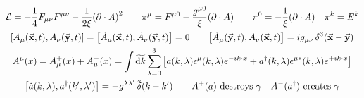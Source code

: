 \begin{gather*}
        \Lc = -\frac{1}{4}F_{\mu\nu}F^{\mu\nu} - \frac{1}{2\xi}\qty(\partial\cdot A)^2
        \qquad
        \pi^\mu = F^{\mu0} - \frac{g^{\mu0}}{\xi}\qty(\partial\cdot A)
        \qquad
        \pi^0 = -\frac{1}{\xi}\qty(\partial\cdot A)
        \quad
        \pi^k = E^k
        \\
        \comm{A_\mu(\va{x},t)}{A_\nu(\va{y},t)}
        = \comm{\dot{A}_\mu(\va{x},t)}{\dot{A}_\nu(\va{y},t)}
        = 0
        \qquad
        \comm{\dot{A}_\mu(\va{y},t)}{A_\nu(\va{x},t)}
        = ig_{\mu\nu}\Ddelta[3](\va{x}-\va{y})
        \\
        A^\mu(x)
        = A_\mu^+(x) + A_\mu^-(x)
        = \int\Tdd{k} \sum_{\lambda=0}^3\qty[a(k,\lambda)\epsilon^\mu(k,\lambda)e^{-ik\cdot x} + a^\dagger(k,\lambda)\epsilon^{\mu *}(k,\lambda)e^{+ik\cdot x}]
        \\
        \comm{\dot{a}(k,\lambda)}{a^\dagger(k',\lambda')}
        = - g^{\lambda\lambda'}\Tdelta(k-k')
        \qquad
        A^+(a) \text{ destroys } \ce{\gamma}
        \quad
        A^-(a^\dagger) \text{ creates } \ce{\gamma}
\end{gather*}
